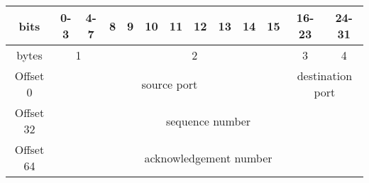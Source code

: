 \begin{table}[H]
	\centering
	\label{tcp-header}
	\begin{tabular}{|c|c|c|c|c|c|c|c|c|c|c|c|c|}
		\hline
		bits       & 0-3                                                   & 4-7      & 8                                                 & 9                                                 & 10                                                & 11                                                & 12                                                & 13                                                & 14                                                & 15                                                & 16-23             & 24-31             \\ \hline
		bytes      & \multicolumn{2}{c|}{1}                                           & \multicolumn{8}{c|}{2}                                                                                                                                                                                                                                                                                                                                                                                                        & 3                 & 4                 \\ \hline
		Offset 0   & \multicolumn{10}{c|}{source port}                                                                                                                                                                                                                                                                                                                                                                                                                                                                & \multicolumn{2}{c|}{destination port} \\ \hline
		Offset 32  & \multicolumn{12}{c|}{sequence number}                                                                                                                                                                                                                                                                                                                                                                                                                                                                                                    \\ \hline
		Offset 64  & \multicolumn{12}{c|}{acknowledgement number}                                                                                                                                                                                                                                                                                                                                                                                                                                                                                             \\ \hline

\end{tabular}
\end{table}
